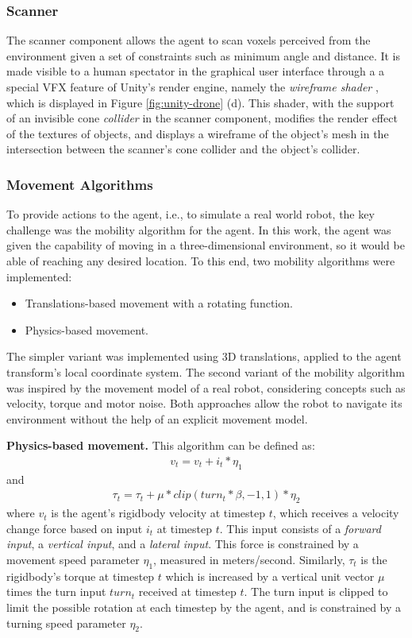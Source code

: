 \subsubsection{Scanner}
The scanner component allows the agent to scan voxels perceived from the environment given a set of constraints such as minimum angle and distance. It is made visible to a human spectator in the graphical user interface through a a special VFX feature of Unity's render engine, namely the \textit{wireframe shader} \cite{unity-asset-store}, which is displayed in Figure \ref{fig:unity-drone} (d). This shader, with the support of an invisible cone \textit{collider} \cite{unity2021} in the scanner component, modifies the render effect of the textures of objects, and displays a wireframe of the object's mesh in the intersection between the scanner's cone collider and the object's collider.

\subsubsection{Movement Algorithms}
To provide actions to the agent, i.e., to simulate a real world robot, the key challenge was the mobility algorithm for the agent. In this work, the agent was given the capability of moving in a three-dimensional environment, so it would be able of reaching any desired location.
To this end, two mobility algorithms were implemented:
\begin{itemize}
    \item Translations-based movement with a rotating function.
    \item Physics-based movement.
\end{itemize}
The simpler variant was implemented using 3D translations, applied to the agent transform's local coordinate system.
The second variant of the mobility algorithm was inspired by the movement model of a real robot, considering concepts such as velocity, torque and motor noise. Both approaches allow the robot to navigate its environment without the help of an explicit movement model.

\textbf{Physics-based movement.}
This algorithm can be defined as:
\begin{align*}
    v_t = v_t + i_t * \eta_1
\end{align*}
and
\begin{align*}
    \tau_t = \tau_t + \mu * clip(turn_t * \beta, -1, 1) * \eta_2
\end{align*}
where $v_t$ is the agent's rigidbody velocity at timestep $t$, which receives a velocity change force based on input $i_t$ at timestep $t$. This input consists of a \textit{forward input}, a \textit{vertical input}, and a \textit{lateral input}. This force is constrained by a movement speed parameter $\eta_1$, measured in meters/second. Similarly, $\tau_t$ is the rigidbody's torque at timestep $t$ which is increased by a vertical unit vector $\mu$ times the turn input $turn_t$ received at timestep $t$. The turn input is clipped to limit the possible rotation at each timestep by the agent, and is constrained by a turning speed parameter $\eta_2$.

